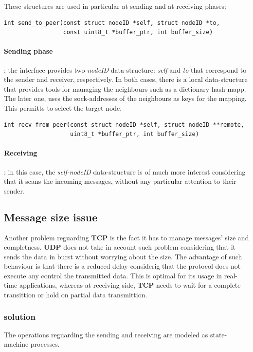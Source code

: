 These structures are used in particular at sending and at receiving phases:
\begin{lstlisting}
int send_to_peer(const struct nodeID *self, struct nodeID *to,
                 const uint8_t *buffer_ptr, int buffer_size)
\end{lstlisting}
\paragraph{Sending phase}: the interface provides two \textit{nodeID} data-structure: \textit{self} and
\textit{to} that correspond to the sender and receiver, respectively. In both cases, there is a local
data-structure that provides tools for managing the neighbours such as a dictionary hash-mapp. The later
one, uses  the sock-addresses of the neighbours as keys for the mapping. This permitts to select the target
node.

\begin{lstlisting}
int recv_from_peer(const struct nodeID *self, struct nodeID **remote,
                   uint8_t *buffer_ptr, int buffer_size)
\end{lstlisting}
\paragraph{Receiving}: in this case, the \textit{self-nodeID} data-structure is of much more interest
considering that it scans the incoming messages, without any particular attention to their sender.


\subsection{Message size issue}
Another problem reguarding \textbf{TCP} is the fact it has to manage messages' size and completness.
\textbf{UDP} does not take in account such problem considering that it sends the data in burst without
worrying about the size. The advantage of such behaviour is that there is a reduced delay considerig that
the protocol does not execute any control the transmitted data. This is optimal for its usage in real-time
applications, whereas at receiving side, \textbf{TCP} needs to wait for a complete transittion or hold on
partial data transmittion.

\subsubsection{solution}
The operations reguarding the sending and receiving are modeled as state-machine processes.

